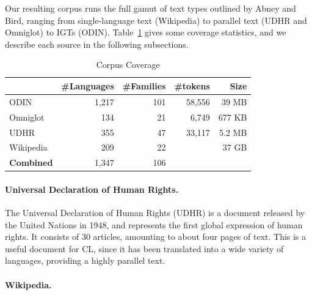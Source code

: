 

Our resulting corpus runs the full gamut of text types outlined by Abney and Bird, ranging from single-language text (Wikipedia) to parallel text (UDHR and Omniglot) to IGTs (ODIN).  Table~\ref{table:corpus} gives some coverage statistics, and we describe each source in the following subsections.


\begin{table}[t]
\small
\centering
    \begin{tabular}{l|rr|rr}
    ~         				& \#Languages & \#Families 	&\#tokens		& Size	\\ \hline
    ODIN      				& 1,217      & 101       		& 58,556		& 39 MB		\\
    Omniglot  				& 134        & 21        		&	6,749			& 677 KB	\\
    UDHR      				& 355        & 47        		&	33,117		& 5.2 MB	\\
    Wikipedia 				& 209        & 22       		&						& 37 GB		\\ \hline
    \textbf{Combined}	& 1,347			 & 106 
    \end{tabular}
\caption{Corpus Coverage}
\label{table:corpus}
\end{table}



\paragraph{Universal Declaration of Human Rights.}

The Universal Declaration of Human Rights (UDHR) is a document released by the United Nations in 1948, and represents the first global expression of human rights. It consists of 30 articles, amounting to about four pages of text. This is a useful document for CL, since it has been translated into a wide variety of languages, providing a highly parallel text.


\paragraph{Wikipedia.}

